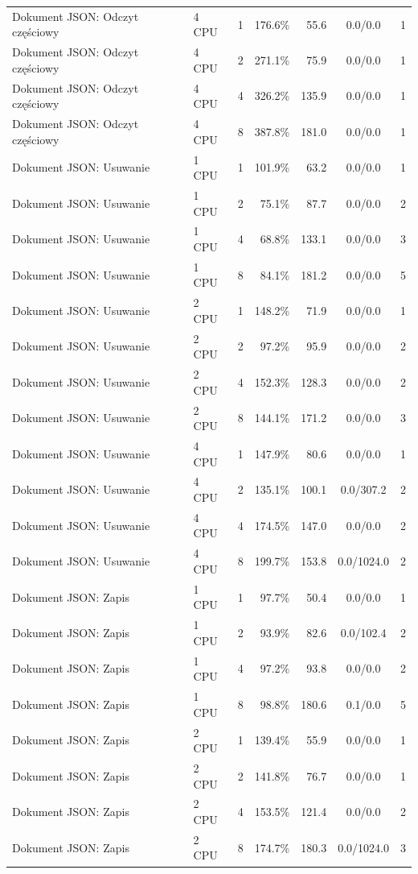 \begin{table}[ht]
{\begin{tabular}{llcrrcc}
Dokument JSON: Odczyt częściowy & 4 CPU & 1 & 176.6\% & 55.6 & 0.0/0.0 & 1 \\
Dokument JSON: Odczyt częściowy & 4 CPU & 2 & 271.1\% & 75.9 & 0.0/0.0 & 1 \\
Dokument JSON: Odczyt częściowy & 4 CPU & 4 & 326.2\% & 135.9 & 0.0/0.0 & 1 \\
Dokument JSON: Odczyt częściowy & 4 CPU & 8 & 387.8\% & 181.0 & 0.0/0.0 & 1 \\
Dokument JSON: Usuwanie & 1 CPU & 1 & 101.9\% & 63.2 & 0.0/0.0 & 1 \\
Dokument JSON: Usuwanie & 1 CPU & 2 & 75.1\% & 87.7 & 0.0/0.0 & 2 \\
Dokument JSON: Usuwanie & 1 CPU & 4 & 68.8\% & 133.1 & 0.0/0.0 & 3 \\
Dokument JSON: Usuwanie & 1 CPU & 8 & 84.1\% & 181.2 & 0.0/0.0 & 5 \\
Dokument JSON: Usuwanie & 2 CPU & 1 & 148.2\% & 71.9 & 0.0/0.0 & 1 \\
Dokument JSON: Usuwanie & 2 CPU & 2 & 97.2\% & 95.9 & 0.0/0.0 & 2 \\
Dokument JSON: Usuwanie & 2 CPU & 4 & 152.3\% & 128.3 & 0.0/0.0 & 2 \\
Dokument JSON: Usuwanie & 2 CPU & 8 & 144.1\% & 171.2 & 0.0/0.0 & 3 \\
Dokument JSON: Usuwanie & 4 CPU & 1 & 147.9\% & 80.6 & 0.0/0.0 & 1 \\
Dokument JSON: Usuwanie & 4 CPU & 2 & 135.1\% & 100.1 & 0.0/307.2 & 2 \\
Dokument JSON: Usuwanie & 4 CPU & 4 & 174.5\% & 147.0 & 0.0/0.0 & 2 \\
Dokument JSON: Usuwanie & 4 CPU & 8 & 199.7\% & 153.8 & 0.0/1024.0 & 2 \\
Dokument JSON: Zapis & 1 CPU & 1 & 97.7\% & 50.4 & 0.0/0.0 & 1 \\
Dokument JSON: Zapis & 1 CPU & 2 & 93.9\% & 82.6 & 0.0/102.4 & 2 \\
Dokument JSON: Zapis & 1 CPU & 4 & 97.2\% & 93.8 & 0.0/0.0 & 2 \\
Dokument JSON: Zapis & 1 CPU & 8 & 98.8\% & 180.6 & 0.1/0.0 & 5 \\
Dokument JSON: Zapis & 2 CPU & 1 & 139.4\% & 55.9 & 0.0/0.0 & 1 \\
Dokument JSON: Zapis & 2 CPU & 2 & 141.8\% & 76.7 & 0.0/0.0 & 1 \\
Dokument JSON: Zapis & 2 CPU & 4 & 153.5\% & 121.4 & 0.0/0.0 & 2 \\
Dokument JSON: Zapis & 2 CPU & 8 & 174.7\% & 180.3 & 0.0/1024.0 & 3 \\

\end{tabular}}
\end{table}
